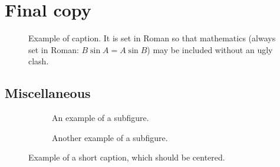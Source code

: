 \section{Final copy}



\begin{figure}[t]
  \centering
  \fbox{\rule{0pt}{2in} \rule{0.9\linewidth}{0pt}}

   \caption{Example of caption.
   It is set in Roman so that mathematics (always set in Roman: $B \sin A = A \sin B$) may be included without an ugly clash.}
   \label{fig:onecol}
\end{figure}

\subsection{Miscellaneous}
\begin{figure}
  \centering
  \begin{subfigure}{0.68\linewidth}
    \fbox{\rule{0pt}{2in} \rule{.9\linewidth}{0pt}}
    \caption{An example of a subfigure.}
    \label{fig:short-a}
  \end{subfigure}
  \hfill
  \begin{subfigure}{0.28\linewidth}
    \fbox{\rule{0pt}{2in} \rule{.9\linewidth}{0pt}}
    \caption{Another example of a subfigure.}
    \label{fig:short-b}
  \end{subfigure}
  \caption{Example of a short caption, which should be centered.}
  \label{fig:short}
\end{figure}

